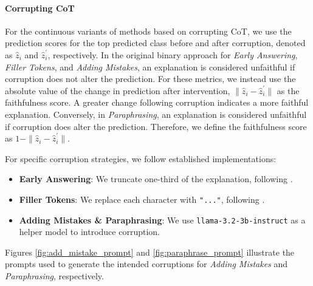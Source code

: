 \paragraph{Corrupting CoT} For the continuous variants of methods based on corrupting CoT, we use the prediction scores for the top predicted class before and after corruption, denoted as $\hat{z}_i$ and $\hat{z}^{\prime}_i$, respectively. In the original binary approach for \textit{Early Answering}, \textit{Filler Tokens}, and \textit{Adding Mistakes}, an explanation is considered unfaithful if corruption does not alter the prediction. For these metrics, we instead use the absolute value of the change in prediction after intervention, $\| \hat{z}_i - \hat{z}^{\prime}_i \|$ as the faithfulness score. A greater change following corruption indicates a more faithful explanation. Conversely, in \textit{Paraphrasing}, an explanation is considered unfaithful if corruption does alter the prediction. Therefore, we define the faithfulness score as  $1 - \| \hat{z}_i - \hat{z}^{\prime}_i \|$.

For specific corruption strategies, we follow established implementations:  
\begin{itemize}
    \item \textbf{Early Answering}: We truncate one-third of the explanation, following \citet{Parcalabescu2023OnMF}.  
    \item \textbf{Filler Tokens}: We replace each character with \texttt{"..."}, following \citet{Parcalabescu2023OnMF}.  
    \item \textbf{Adding Mistakes \& Paraphrasing}: We use \texttt{llama-3.2-3b-instruct} as a helper model to introduce corruption.  
\end{itemize} 

Figures \ref{fig:add_mistake_prompt} and \ref{fig:paraphrase_prompt} illustrate the prompts used to generate the intended corruptions for \textit{Adding Mistakes} and \textit{Paraphrasing}, respectively.
